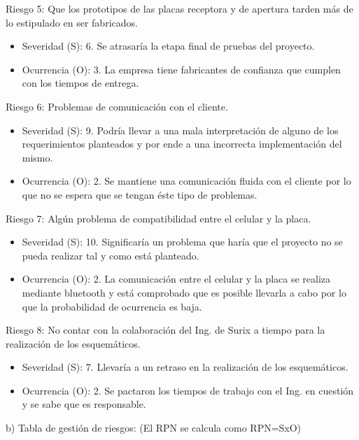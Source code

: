 \documentclass[11pt]{charter}
\begin{document}
Riesgo 5: Que los prototipos de las placas receptora y de apertura tarden más de lo estipulado en ser fabricados.
\begin{itemize}
\item Severidad (S): 6. Se atrasaría la etapa final de pruebas del proyecto.
\item Ocurrencia (O): 3. La empresa tiene fabricantes de confianza que cumplen con los tiempos de entrega.
\end{itemize}

Riesgo 6: Problemas de comunicación con el cliente.
\begin{itemize}
\item Severidad (S): 9. Podría llevar a una mala interpretación de alguno de los requerimientos planteados y por ende a una incorrecta implementación del mismo.
\item Ocurrencia (O): 2. Se mantiene una comunicación fluida con el cliente por lo que no se espera que se tengan éste tipo de problemas.
\end{itemize}

Riesgo 7: Algún problema de compatibilidad entre el celular y la placa.
\begin{itemize}
\item Severidad (S): 10. Significaría un problema que haría que el proyecto no se pueda realizar tal y como está planteado.
\item Ocurrencia (O): 2. La comunicación entre el celular y la placa se realiza mediante bluetooth y está comprobado que es posible llevarla a cabo por lo que la probabilidad de ocurrencia es baja.
\end{itemize}

Riesgo 8: No contar con la colaboración del Ing. de Surix a tiempo para la realización de los esquemáticos.
\begin{itemize}
\item Severidad (S): 7. Llevaría a un retraso en la realización de los esquemáticos.
\item Ocurrencia (O): 2. Se pactaron los tiempos de trabajo con el Ing. en cuestión y se sabe que es responsable. 
\end{itemize}




b) Tabla de gestión de riesgos:      (El RPN se calcula como RPN=SxO)
\end{document}
